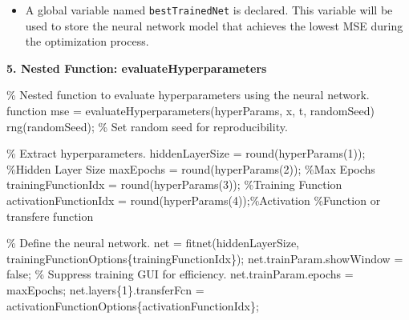 \documentclass[
]{agujournal2019}
\newenvironment{Shaded}{\begin{snugshade}}{\end{snugshade}}
\newcommand{\CommentTok}[1]{\textcolor[rgb]{0.37,0.37,0.37}{#1}}
\newcommand{\FloatTok}[1]{\textcolor[rgb]{0.68,0.00,0.00}{#1}}
\newcommand{\KeywordTok}[1]{\textcolor[rgb]{0.00,0.23,0.31}{#1}}
\newcommand{\NormalTok}[1]{\textcolor[rgb]{0.00,0.23,0.31}{#1}}
\newcommand{\OperatorTok}[1]{\textcolor[rgb]{0.37,0.37,0.37}{#1}}
\newcommand{\VariableTok}[1]{\textcolor[rgb]{0.07,0.07,0.07}{#1}}
\providecommand{\tightlist}{%
  \setlength{\itemsep}{0pt}\setlength{\parskip}{0pt}}\usepackage{longtable,booktabs,array}
\begin{document}
\begin{itemize}
\tightlist
\item
  A global variable named \texttt{bestTrainedNet} is declared. This
  variable will be used to store the neural network model that achieves
  the lowest MSE during the optimization process.
\end{itemize}

\textbf{5. Nested Function: evaluateHyperparameters}

\begin{Shaded}
\begin{Highlighting}[]
\CommentTok{\% Nested function to evaluate hyperparameters using the neural network.}
    \KeywordTok{function} \VariableTok{mse} \OperatorTok{=} \VariableTok{evaluateHyperparameters}\NormalTok{(}\VariableTok{hyperParams}\OperatorTok{,} \VariableTok{x}\OperatorTok{,} \VariableTok{t}\OperatorTok{,} \VariableTok{randomSeed}\NormalTok{)}
        \VariableTok{rng}\NormalTok{(}\VariableTok{randomSeed}\NormalTok{)}\OperatorTok{;} \CommentTok{\% Set random seed for reproducibility.}

        \CommentTok{\% Extract hyperparameters.}
        \VariableTok{hiddenLayerSize} \OperatorTok{=} \VariableTok{round}\NormalTok{(}\VariableTok{hyperParams}\NormalTok{(}\FloatTok{1}\NormalTok{))}\OperatorTok{;} \CommentTok{\%Hidden Layer Size}
        \VariableTok{maxEpochs} \OperatorTok{=} \VariableTok{round}\NormalTok{(}\VariableTok{hyperParams}\NormalTok{(}\FloatTok{2}\NormalTok{))}\OperatorTok{;}       \CommentTok{\%Max Epochs}
        \VariableTok{trainingFunctionIdx} \OperatorTok{=} \VariableTok{round}\NormalTok{(}\VariableTok{hyperParams}\NormalTok{(}\FloatTok{3}\NormalTok{))}\OperatorTok{;} \CommentTok{\%Training Function}
        \VariableTok{activationFunctionIdx} \OperatorTok{=} \VariableTok{round}\NormalTok{(}\VariableTok{hyperParams}\NormalTok{(}\FloatTok{4}\NormalTok{))}\OperatorTok{;}\CommentTok{\%Activation }
        \CommentTok{\%Function or transfere function}

        \CommentTok{\% Define the neural network.}
        \VariableTok{net} \OperatorTok{=} \VariableTok{fitnet}\NormalTok{(}\VariableTok{hiddenLayerSize}\OperatorTok{,} \VariableTok{trainingFunctionOptions}\NormalTok{\{}\VariableTok{trainingFunctionIdx}\NormalTok{\})}\OperatorTok{;}
        \VariableTok{net}\NormalTok{.}\VariableTok{trainParam}\NormalTok{.}\VariableTok{showWindow} \OperatorTok{=} \VariableTok{false}\OperatorTok{;} \CommentTok{\% Suppress training GUI for efficiency.}
        \VariableTok{net}\NormalTok{.}\VariableTok{trainParam}\NormalTok{.}\VariableTok{epochs} \OperatorTok{=} \VariableTok{maxEpochs}\OperatorTok{;}
        \VariableTok{net}\NormalTok{.}\VariableTok{layers}\NormalTok{\{}\FloatTok{1}\NormalTok{\}.}\VariableTok{transferFcn} \OperatorTok{=} \VariableTok{activationFunctionOptions}\NormalTok{\{}\VariableTok{activationFunctionIdx}\NormalTok{\}}\OperatorTok{;}


\end{Highlighting}
\end{Shaded}
\end{document}
